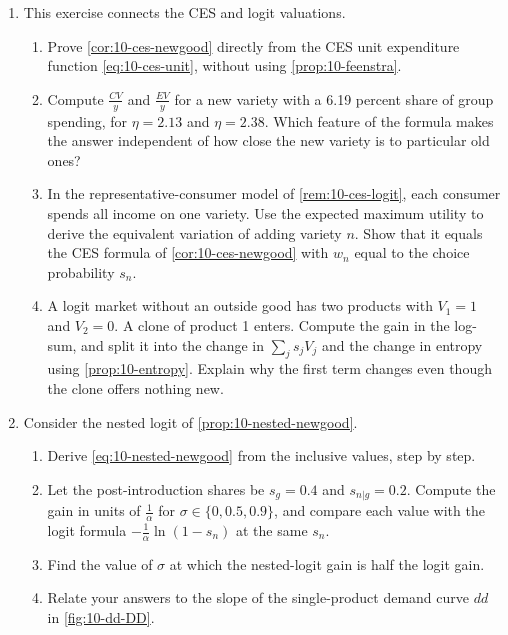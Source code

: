\begin{enumerate}[label=\arabic*., leftmargin=*, itemsep=6pt]
\item This exercise connects the CES and logit valuations.
\begin{enumerate}[label=(\alph*)]
  \item Prove \cref{cor:10-ces-newgood} directly from the CES unit expenditure function \eqref{eq:10-ces-unit},
  without using \cref{prop:10-feenstra}.
  \item Compute $\frac{CV}{y}$ and $\frac{EV}{y}$ for a new variety with a 6.19 percent share of group spending, for
  $\eta = 2.13$ and $\eta = 2.38$. Which feature of the formula makes the answer independent of how close the new
  variety is to particular old ones?
  \item In the representative-consumer model of \cref{rem:10-ces-logit}, each consumer spends all income on one
  variety. Use the expected maximum utility to derive the equivalent variation of adding variety $n$. Show that it
  equals the CES formula of \cref{cor:10-ces-newgood} with $w_n$ equal to the choice probability $s_n$.
  \item A logit market without an outside good has two products with $V_1 = 1$ and $V_2 = 0$. A clone of product 1
  enters. Compute the gain in the log-sum, and split it into the change in $\sum_js_jV_j$ and the change in entropy
  using \cref{prop:10-entropy}. Explain why the first term changes even though the clone offers nothing new.
\end{enumerate}

\item Consider the nested logit of \cref{prop:10-nested-newgood}.
\begin{enumerate}[label=(\alph*)]
  \item Derive \eqref{eq:10-nested-newgood} from the inclusive values, step by step.
  \item Let the post-introduction shares be $s_g = 0.4$ and $s_{n|g} = 0.2$. Compute the gain in units of
  $\frac{1}{\alpha}$ for $\sigma \in \{0, 0.5, 0.9\}$, and compare each value with the logit formula
  $-\frac{1}{\alpha}\ln(1 - s_n)$ at the same $s_n$.
  \item Find the value of $\sigma$ at which the nested-logit gain is half the logit gain.
  \item Relate your answers to the slope of the single-product demand curve $dd$ in \cref{fig:10-dd-DD}.
\end{enumerate}


\end{enumerate}
